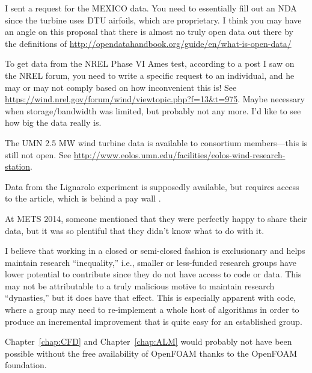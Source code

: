 

I sent a request for the MEXICO data. You need to essentially fill out an NDA
since the turbine uses DTU airfoils, which are proprietary. I think you may have
an angle on this proposal that there is almost no truly open data out there by
the definitions of \url{http://opendatahandbook.org/guide/en/what-is-open-data/}

To get data from the NREL Phase VI Ames test, according to a post I saw on the
NREL forum, you need to write a specific request to an individual, and he may or
may not comply based on how inconvenient this is! See
\url{https://wind.nrel.gov/forum/wind/viewtopic.php?f=13&t=975}. Maybe necessary
when storage/bandwidth was limited, but probably not any more. I'd like to see
how big the data really is.

The UMN 2.5 MW wind turbine data is available to consortium members---this is
still not open. See
\url{http://www.eolos.umn.edu/facilities/eolos-wind-research-station}.

Data from the Lignarolo experiment is supposedly available, but requires access
to the article, which is behind a pay wall \cite{Lignarolo2014}.

At METS 2014, someone mentioned that they were perfectly happy to share their
data, but it was so plentiful that they didn't know what to do with it.

I believe that working in a closed or semi-closed fashion is exclusionary and
helps maintain research ``inequality,'' i.e., smaller or less-funded research
groups have lower potential to contribute since they do not have access to code
or data. This may not be attributable to a truly malicious motive to maintain
research ``dynasties,'' but it does have that effect. This is especially
apparent with code, where a group may need to re-implement a whole host of
algorithms in order to produce an incremental improvement that is quite easy for
an established group.

Chapter~\ref{chap:CFD} and Chapter~\ref{chap:ALM} would probably not have been
possible without the free availability of OpenFOAM thanks to the OpenFOAM
foundation.
